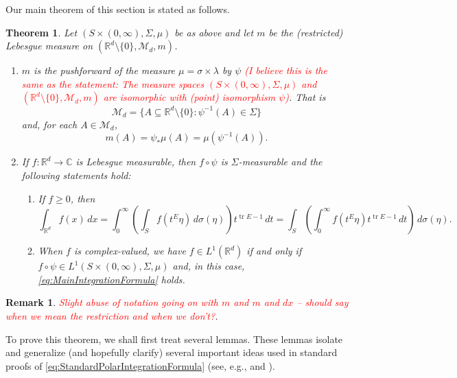\documentclass[11pt]{article}
\theoremstyle{theorem}
\newtheorem{theorem}{Theorem}[section]
\newtheorem{remark}{Remark}
\newcommand\tr{\operatorname{tr}}
\begin{document}
\noindent Our main theorem of this section is stated as follows. 


\begin{theorem}\label{thm:MainIntegrationFormula}
Let $(S\times (0,\infty),\Sigma,\mu)$ be as above and let $m$ be the (restricted) Lebesgue measure on $(\mathbb{R}^d\setminus\{0\},\mathcal{M}_d,m)$.
\begin{enumerate}
\item\label{item:MainIntegrationFormula1} $m$ is the pushforward of the measure $\mu=\sigma\times\lambda$ by $\psi$ \textcolor{red}{(I believe this is the same as the statement: The measure spaces $(S\times (0,\infty),\Sigma,\mu)$ and $(\mathbb{R}^d\setminus\{0\},\mathcal{M}_d,m)$ are isomorphic with (point) isomorphism $\psi$)}. That is
\begin{equation*}
\mathcal{M}_d=\{A\subseteq \mathbb{R}^d\setminus\{0\}:\psi^{-1}(A)\in\Sigma\}
\end{equation*}
and, for each $A\in\mathcal{M}_d$,
\begin{equation*}
m(A)=\psi_*\mu(A)=\mu(\psi^{-1}(A)).
\end{equation*}
\item\label{item:MainintegrationFormula2} If $f:\mathbb{R}^d\to\mathbb{C}$ is Lebesgue measurable, then $f\circ \psi$ is $\Sigma$-measurable and the following statements hold:
\begin{enumerate}
\item If $f\geq 0$, then
\begin{equation}\label{eq:MainIntegrationFormula}
\int_{\mathbb{R}^d}f(x)\,dx=\int_0^\infty\left(\int_S f(t^E\eta)\,d\sigma(\eta)\right)t^{\tr E-1}\,dt=\int_S\left(\int_0^\infty f(t^E\eta)t^{\tr E-1}\,dt\right)\,d\sigma(\eta).
\end{equation}
\item When $f$ is complex-valued, we have $f\in L^1(\mathbb{R}^d)$ if and only if $f\circ\psi\in L^1(S\times (0,\infty),\Sigma,\mu)$ and, in this case, \eqref{eq:MainIntegrationFormula} holds.
\end{enumerate}
\end{enumerate}
\end{theorem}

\begin{remark}
\textcolor{red}{Slight abuse of notation going on with $m$ and $m$ and $dx$ -- should say when we mean the restriction and when we don't?}.
\end{remark}

\noindent To prove this theorem, we shall first treat several lemmas. These lemmas isolate and generalize (and hopefully clarify) several important ideas used in standard proofs of \eqref{eq:StandardPolarIntegrationFormula} (see, e.g., \cite{Folland1984} and \cite{Stein2005}). 
\end{document}
